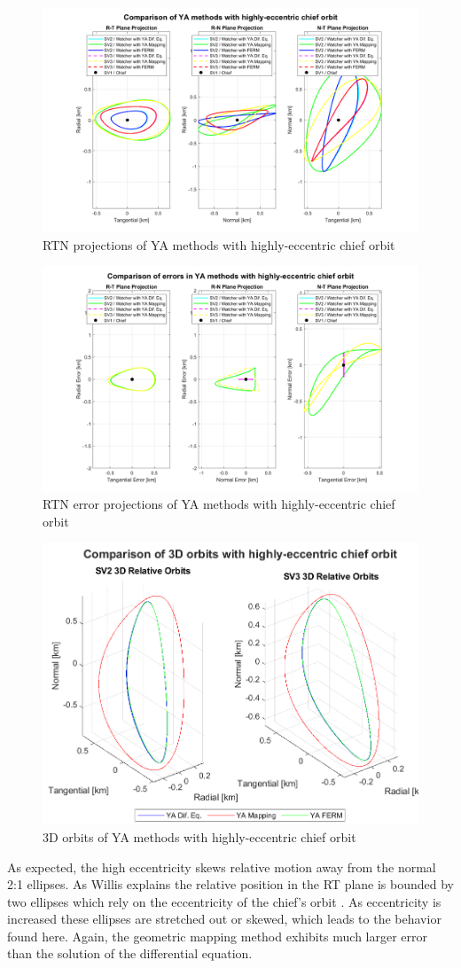 \begin{figure}[H]
    \centering
    \includegraphics[width=0.7\linewidth]{sim/figures/PS3/RTN_projections_YA_comparison_3.png}
    \caption{RTN projections of YA methods with highly-eccentric chief orbit}
    \label{fig:RTN_comp_3}
\end{figure}
\begin{figure}[H]
    \centering
    \includegraphics[width=0.7\linewidth]{sim/figures/PS3/RTN_error_projections_YA_comparison_3.png}
    \caption{RTN error projections of YA methods with highly-eccentric chief orbit}
    \label{fig:RTN_error_comp_3}
\end{figure}
\begin{figure}[H]
    \centering
    \includegraphics[width=0.7\linewidth]{sim/figures/PS3/3D_YA_comparison_3.png}
    \caption{3D orbits of YA methods with highly-eccentric chief orbit}
    \label{fig:3D_orbits_YA_comp_3}
\end{figure}

As expected, the high eccentricity skews relative motion away from the normal 2:1 ellipses. As Willis explains the relative position in the RT plane is bounded by two ellipses which rely on the eccentricity of the chief's orbit \cite{willis2023analytical}. As eccentricity is increased these ellipses are stretched out or skewed, which leads to the behavior found here. Again, the geometric mapping method exhibits much larger error than the solution of the differential equation. 